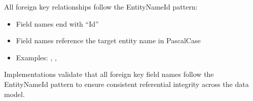 All foreign key relationships \MUST{} follow the EntityNameId pattern:
\begin{itemize}
    \item Field names \MUST{} end with ``Id''
    \item Field names \MUST{} reference the target entity name in PascalCase
    \item Examples: , , 
\end{itemize}

\begin{normative}[title=Foreign Key Naming Convention]
Implementations \MUST{} validate that all foreign key field names follow the EntityNameId pattern to ensure consistent referential integrity across the data model.
\end{normative}